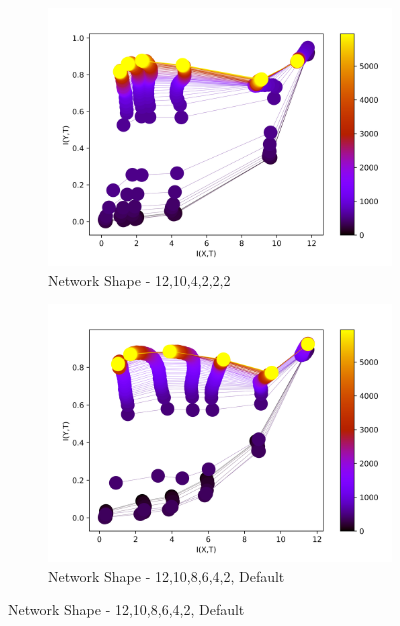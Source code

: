 \documentclass[dissertation.tex]{subfiles}
\begin{document}
\begin{figure}[ht]
  \centering
  \begin{subfigure}[t]{0.32\textwidth}
    \centering
    \includegraphics[width=\textwidth]{figs/eval/networkShape/KDE10,4,2,2.png}
    \caption{
      Network Shape - 12,10,4,2,2,2
    }
    \label{figNetworkShapeDefault}
  \end{subfigure}
  \hfill
  \begin{subfigure}[t]{0.32\textwidth}
    \centering
    \includegraphics[width=\textwidth]{figs/eval/networkShape/KDE10,8,6,4.png}
    \caption{
      Network Shape - 12,10,8,6,4,2, Default
    }
    \label{figNetworkShape2}
  \end{subfigure}
  \hfill

\end{figure}
\end{document}
